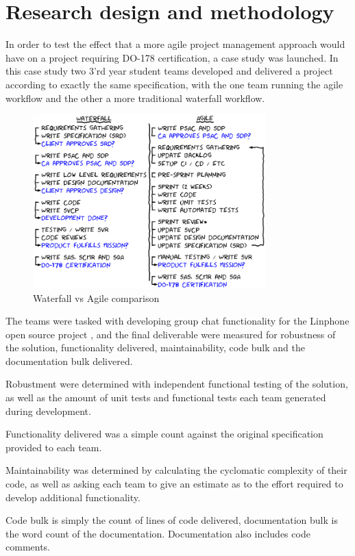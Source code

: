 \documentclass{sig-alternate-05-2015}
\begin{document}
\section{Research design and methodology}

In order to test the effect that a more agile project management approach would have on a project requiring DO-178 certification, a case study was launched. In this case study two 3'rd year student teams developed and delivered a project according to exactly the same specification, with the one team running the agile workflow and the other a more traditional waterfall workflow.  

\begin{figure}[t!]
	\centering 
	\includegraphics[width=90mm]{agileWaterfallTeamActivities.png}
	\caption{Waterfall vs Agile comparison}
\end{figure}

The teams were tasked with developing group chat functionality for the Linphone open source project \cite{Linphone_2015}, and the final deliverable were measured for robustness of the solution, functionality delivered, maintainability, code bulk and the documentation bulk delivered.

Robustment were determined with independent functional testing of the solution, as well as the amount of unit tests and functional tests each team generated during development. 

Functionality delivered was a simple count against the original specification provided to each team.

Maintainability was determined by calculating the cyclomatic complexity of their code, as well as asking each team to give an estimate as to the effort required to develop additional functionality.

Code bulk is simply the count of lines of code delivered, documentation bulk is the word count of the documentation. Documentation also includes code comments.
\end{document}
